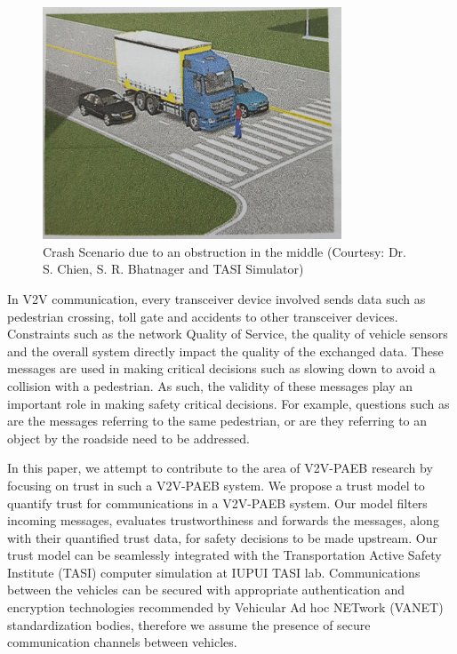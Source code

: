 \documentclass[conference]{IEEEtran}
\begin{document}
\begin{figure}[h]
\centering
\includegraphics[width=3.5in]{v2vpaeb_scenario_compressed.jpg}
\caption{Crash Scenario due to an obstruction in the middle (Courtesy: Dr. S. Chien, S. R. Bhatnager and TASI Simulator)}
\label{obstc}
\end{figure}

In V2V communication, every transceiver device involved sends data such as pedestrian crossing, toll gate and accidents to other transceiver devices. Constraints such as the network Quality of Service, the quality of vehicle sensors and the overall system directly impact the quality of the exchanged data. These messages are used in making critical decisions such as slowing down to avoid a collision with a pedestrian. As such, the validity of these messages play an important role in making safety critical decisions. For example, questions such as are the messages referring to the same pedestrian, or are they referring to an object by the roadside need to be addressed.


In this paper, we attempt to contribute to the area of V2V-PAEB research by focusing on trust in such a V2V-PAEB system. We propose a trust model to quantify trust for communications in a V2V-PAEB system. Our model filters incoming messages, evaluates trustworthiness and forwards the messages, along with their quantified trust data, for safety decisions to be made upstream. Our trust model can be seamlessly integrated with the Transportation Active Safety Institute (TASI) computer simulation at IUPUI TASI lab. Communications between the vehicles can be secured with appropriate authentication and encryption technologies recommended by Vehicular Ad hoc NETwork (VANET) standardization bodies, therefore we assume the presence of secure communication channels between vehicles. 
 
\end{document}
